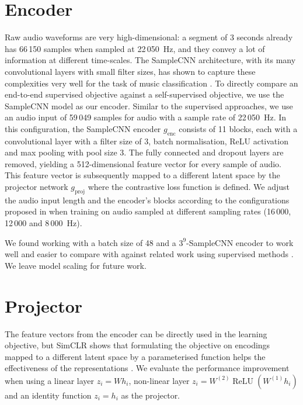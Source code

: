 \section{Encoder}
Raw audio waveforms are very high-dimensional: a segment of 3 seconds already has 66\,150 samples when sampled at 22\,050~Hz, and they convey a lot of information at different time-scales.
The SampleCNN architecture, with its many convolutional layers with small filter sizes, has shown to capture these complexities very well for the task of music classification \cite{lee2018samplecnn}.
To directly compare an end-to-end supervised objective against a self-supervised objective, we use the SampleCNN model as our encoder.
Similar to the supervised approaches, we use an audio input of 59\,049 samples for audio with a sample rate of 22\,050~Hz.
In this configuration, the SampleCNN encoder $g_{\mathrm{enc}}$ consists of 11 blocks, each with a convolutional layer with a filter size of 3, batch normalisation, ReLU activation and max pooling with pool size 3.
The fully connected and dropout layers are removed, yielding a 512-dimensional feature vector for every sample of audio.
This feature vector is subsequently mapped to a different latent space by the projector network $g_{\mathrm{proj}}$ where the contrastive loss function is defined.
We adjust the audio input length and the encoder's blocks according to the configurations proposed in \cite{lee2018samplecnn} when training on audio sampled at different sampling rates (16\,000, 12\,000 and 8\,000~Hz).

We found working with a batch size of 48 and a $3^9$-SampleCNN encoder to work well and easier to compare with against related work using supervised methods \cite{lee2018samplecnn, dieleman2014end,pons_end--end_2017}.
We leave model scaling for future work.


\section{Projector}
The feature vectors from the encoder can be directly used in the learning objective, but SimCLR shows that formulating the objective on encodings mapped to a different latent space by a parameterised function helps the effectiveness of the representations \cite{chen_simple_2020}.
We evaluate the performance improvement when using a linear layer $z_i = Wh_i$, non-linear layer $z_i = W^{(2)}\operatorname{ReLU}(W^{(1)}h_i)$ and an identity function $z_i = h_i$ as the projector.


